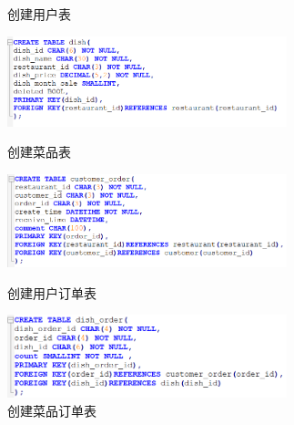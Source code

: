 \documentclass[12pt, oneside,a4paper]{article}
\begin{document}
\begin{itemize}
\begin{figure}[H]
\begin{minipage}[t]{0.5\linewidth}
      \caption{\small{创建用户表}}\label{fig:dummy}
   \end{minipage}
   \begin{minipage}[t]{0.5\linewidth}
    \centering
     \includegraphics[width=3.2in]{table3.png}
     \caption{\small{创建菜品表}}\label{fig:dummy}
   \end{minipage}
   \begin{minipage}[t]{0.5\linewidth}
    \centering
     \includegraphics[width=3.2in]{table4.png}
     \caption{\small{创建用户订单表}}\label{fig:dummy}
   \end{minipage}
   \begin{minipage}[t]{0.5\linewidth}
    \centering
     \includegraphics[width=3.2in]{table5.png}
     \caption{\small{创建菜品订单表}}\label{fig:dummy}
   \end{minipage}
  \end{figure}


\end{itemize}
\end{document}
